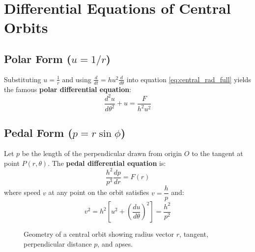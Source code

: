 \section{Differential Equations of Central Orbits}

\subsection{\texorpdfstring{Polar Form ($u = 1/r$)}{Polar Form (u = 1/r)}}
Substituting $u = \frac{1}{r}$ and using $\frac{d}{dt} = h u^2 \frac{d}{d\theta}$ into equation \eqref{eq:central_rad_full} yields the famous \textbf{polar differential equation}:
\begin{equation}
    \frac{d^2 u}{d\theta^2} + u = \frac{F}{h^2 u^2}
\end{equation}

\subsection{\texorpdfstring{Pedal Form ($p = r \sin\phi$)}{Pedal Form (p = r sin phi)}}
Let $p$ be the length of the perpendicular drawn from origin $O$ to the tangent at point $P(r,\theta)$. The \textbf{pedal differential equation} is:
\begin{equation}
    \frac{h^2}{p^3} \frac{dp}{dr} = F(r)
\end{equation}
where speed $v$ at any point on the orbit satisfies $v = \dfrac{h}{p}$ and:
\begin{equation}
    v^2 = h^2 \left[ u^2 + \left(\frac{du}{d\theta}\right)^2 \right] = \frac{h^2}{p^2}
\end{equation}

\begin{figure}[htbp]
\centering
{}
\caption{Geometry of a central orbit showing radius vector $r$, tangent, perpendicular distance $p$, and apses.}
\end{figure}

